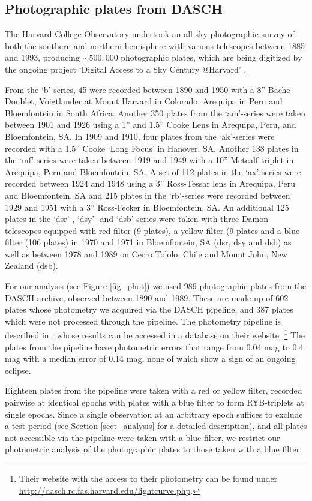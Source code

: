\documentclass[twocolumn]{aa}
\begin{document}
\subsection{Photographic plates from DASCH}
The Harvard College Observatory undertook an all-sky photographic survey of both the southern and northern hemisphere with various telescopes between 1885 and 1993, producing $\sim 500,000$ photographic plates, which are being digitized by the ongoing project `Digital Access to a Sky Century @Harvard' \citep[DASCH;][]{Tang2013}.

From the `b'-series, 45 were recorded between 1890 and 1950 with a 8'' Bache Doublet, Voigtlander at Mount Harvard in Colorado, Arequipa in Peru and Bloemfontein in South Africa.
%
Another 350 plates from the `am'-series were taken between 1901 and 1926 using a 1'' and 1.5'' Cooke Lens in Arequipa, Peru, and Bloemfontein, SA.
%
In 1909 and 1910, four plates from the `ak'-series were recorded with a 1.5'' Cooke `Long Focus' in Hanover, SA. 
%
Another 138 plates in the `mf'-series were taken between 1919 and 1949 with a 10'' Metcalf triplet in Arequipa, Peru and Bloemfontein, SA.
%
A set of 112 plates in the `ax'-series were recorded between 1924 and 1948 using a 3'' Ross-Tessar lens  in Arequipa, Peru and Bloemfontein, SA and 215 plates in the `rb'-series were recorded between 1929 and 1951 with a 3'' Ross-Fecker in Bloemfontein, SA.
%
An additional 125 plates in the `dsr'-, `dsy'- and `dsb'-series  were taken with three Damon telescopes equipped with red filter (9 plates), a yellow filter (9 plates and a blue filter (106 plates) in 1970 and 1971 in Bloemfontein, SA (dsr, dsy and dsb) as well as between 1978 and 1989 on Cerro Tololo, Chile and Mount John, New Zealand (dsb).

For our analysis (see Figure \ref{fig_phot}) we used 989 photographic plates from the DASCH archive, observed between 1890 and 1989.
%
These are made up of 602 plates whose photometry we acquired via the DASCH pipeline, and 387 plates which were not processed through the pipeline.
%
The photometry pipeline is described in \citet{Tang2013}, whose results can be accessed in a database on their website.
%
\footnote{Their website with the access to their photometry can be found under \url{http://dasch.rc.fas.harvard.edu/lightcurve.php}.}
%
The plates from the pipeline have photometric errors that range from 0.04 mag to 0.4 mag with a median error of 0.14 mag, none of which show a sign of an ongoing eclipse.

Eighteen plates from the pipeline were taken with a red or yellow filter, recorded pairwise at identical epochs with plates with a blue filter to form  RYB-triplets at single epochs.
%
Since a single observation at an arbitrary epoch suffices to exclude a test period (see Section \ref{sect_analysis} for a detailed description), and all plates not accessible via the pipeline were taken with a blue filter, we restrict our photometric analysis of the photographic plates to those taken with a blue filter.
\end{document}

